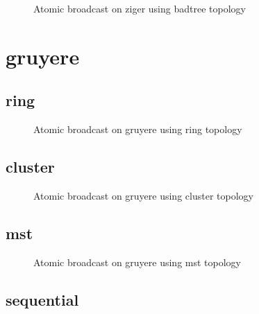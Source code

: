 \begin{figure}[ht!]

\caption{Atomic broadcast on ziger using badtree topology}
\label{fig:ab_ziger_badtree}
\end{figure}
\clearpage\newpage\clearpage\section{gruyere}

\subsection{ring}

\begin{figure}[ht!]

\caption{Atomic broadcast on gruyere using ring topology}
\label{fig:ab_gruyere_ring}
\end{figure}
\clearpage\subsection{cluster}

\begin{figure}[ht!]

\caption{Atomic broadcast on gruyere using cluster topology}
\label{fig:ab_gruyere_cluster}
\end{figure}
\clearpage\subsection{mst}

\begin{figure}[ht!]

\caption{Atomic broadcast on gruyere using mst topology}
\label{fig:ab_gruyere_mst}
\end{figure}
\clearpage\subsection{sequential}

